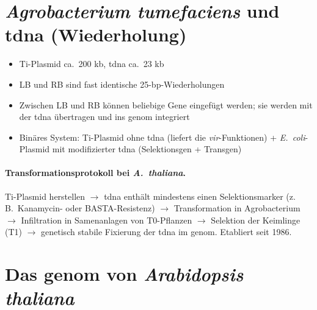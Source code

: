 
\section{\emph{Agrobacterium tumefaciens} und \gls{tdna} (Wiederholung)}\label{sec:art{agrobacterium-tumefaciens}-und-gls{tdna}-(wiederholung)}

\begin{itemize}
    \item Ti-Plasmid ca.\ 200 kb, \gls{tdna} ca.\ 23 kb
    \item LB und RB sind fast identische 25-bp-Wiederholungen
    \item Zwischen LB und RB können beliebige Gene eingefügt werden; sie werden mit der \gls{tdna} übertragen und ins \gls{genom} integriert
    \item Binäres System: Ti-Plasmid ohne \gls{tdna} (liefert die \emph{vir}-Funktionen) + \emph{E.~coli}-Plasmid mit
    modifizierter \gls{tdna} (Selektionsgen + Transgen)
\end{itemize}

\paragraph{Transformationsprotokoll bei \emph{A.~thaliana}.}
Ti-Plasmid herstellen $\to$ \gls{tdna} enthält mindestens einen Selektionsmarker (z.\,B.\ Kanamycin- oder BASTA-Resistenz) $\to$ Transformation in Agrobacterium $\to$ Infiltration in Samenanlagen von T0-Pflanzen $\to$ Selektion der Keimlinge (T1) $\to$ genetisch stabile Fixierung der \gls{tdna} im \gls{genom}.
Etabliert seit 1986.


\section{Das \gls{genom} von \emph{Arabidopsis thaliana}}\label{sec:das-genom-von-art{arabidopsis-thaliana}}

